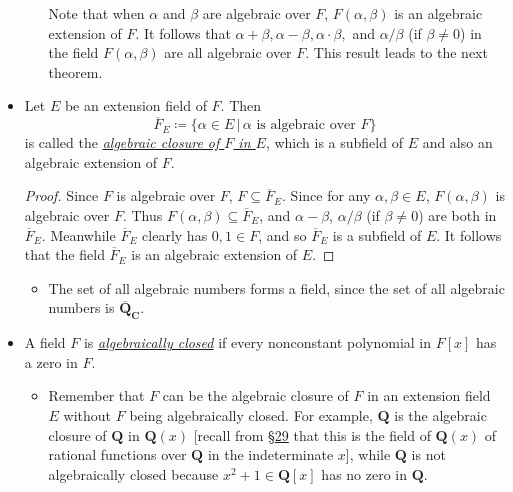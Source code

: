 \documentclass[11pt]{article}
\newcommand{\lk}[2]{\hyperlink{subsection.#1.#2}{\S#2}} %
\newcommand{\where}{\,|\,}
\newcommand{\Q}{\mathbf{Q}}
\newcommand{\C}{\mathbf{C}}
\newcommand{\df}[1]{\ul{\textit{\textsf{#1}}}}
\newcommand{\clos}[1]{\overline{#1}}
\begin{document}
\begin{itemize}
\begin{itemize}
        Note that when $\alpha$ and $\beta$ are algebraic over $F$, $F(\alpha,\beta)$ is an algebraic extension of $F$. It follows that $\alpha + \beta, \alpha - \beta, \alpha \cdot \beta,$ and $\alpha/\beta$ (if $\beta \neq 0$) in the field $F(\alpha,\beta)$ are all algebraic over $F$. This result leads to the next theorem.
    \end{itemize}
    \item Let $E$ be an extension field of $F$. Then \[\clos{F}_E \coloneqq \{\alpha \in E \where \alpha \text{ is algebraic over } F\}\] is called the \df{algebraic closure of $F$ in $E$}, which is a subfield of $E$ and also an algebraic extension of $F$.
    \begin{proof}
        Since $F$ is algebraic over $F$, $F \subseteq \clos{F}_E$. Since for any $\alpha,\beta \in E$, $F(\alpha,\beta)$ is algebraic over $F$. Thus $F(\alpha,\beta) \subseteq \clos{F}_E$, and $\alpha - \beta$, $\alpha/\beta$ (if $\beta \neq 0$) are both in $\clos{F}_E$. Meanwhile $\clos{F}_E$ clearly has $0,1 \in F$, and so $\clos{F}_E$ is a subfield of $E$. It follows that the field $\clos{F}_E$ is an algebraic extension of $E$.
    \end{proof}
    \begin{itemize}
        \item The set of all algebraic numbers forms a field, since the set of all algebraic numbers is $\clos{\Q}_\C$.
    \end{itemize}
    \item A field $F$ is \df{algebraically closed} if every nonconstant polynomial in $F[x]$ has a zero in $F$.
    \begin{itemize}
        \item Remember that $F$ can be the algebraic closure of $F$ in an extension field $E$ without $F$ being algebraically closed. For example, $\Q$ is the algebraic closure of $\Q$ in $\Q(x)$ [recall from \lk{6}{29} that this is the field of $\Q(x)$ of rational functions over $\Q$ in the indeterminate $x$], while $\Q$ is not algebraically closed because $x^2 + 1 \in \Q[x]$ has no zero in $\Q$.


\end{itemize}
\end{itemize}
\end{document}
